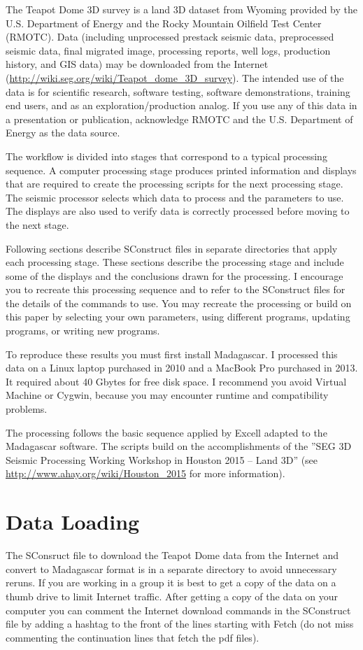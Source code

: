The Teapot Dome 3D survey is a land 3D dataset from Wyoming provided by the U.S. Department of Energy and the Rocky Mountain Oilfield Test Center (RMOTC).  Data (including unprocessed prestack seismic data, preprocessed seismic data, final migrated image, processing reports, well logs, production history, and GIS data) may be downloaded from the Internet (\url{http://wiki.seg.org/wiki/Teapot_dome_3D_survey}).  The intended use of the data is for scientific research, software testing, software demonstrations, training end users, and as an exploration/production analog.  If you use any of this data in a presentation or publication, acknowledge RMOTC and the U.S. Department of Energy as the data source.

The workflow is divided into stages that correspond to a typical processing sequence.  A computer processing stage produces printed information and displays that are required to create the processing scripts for the next processing stage.  The seismic processor selects which data to process and the parameters to use.  The displays are also used to verify data is correctly processed before moving to the next stage.

Following sections describe SConstruct files in separate directories that apply each processing stage.  These sections describe the processing stage and include some of the displays and the conclusions drawn for the processing.  I encourage you to recreate this processing sequence and to refer to the SConstruct files for the details of the commands to use.  You may recreate the processing or build on this paper by selecting your own parameters, using different programs, updating programs, or writing new programs.  

To reproduce these results you must first install Madagascar.  I processed this data on a Linux laptop purchased in 2010 and a MacBook Pro purchased in 2013.  It required about 40 Gbytes for free disk space.  I recommend you avoid Virtual Machine or Cygwin, because you may encounter runtime and compatibility problems.  

The processing follows the basic sequence applied by Excell adapted to the Madagascar software.  The scripts build on the accomplishments of the ''SEG 3D Seismic Processing Working Workshop in Houston 2015 – Land 3D'' (see \url{http://www.ahay.org/wiki/Houston_2015} for more information).

\section{Data Loading}
The SConsruct file to download the Teapot Dome data from the Internet and convert to Madagascar format is in a separate directory to avoid unnecessary reruns.  If you are working in a group it is best to get a copy of the data on a thumb drive to limit Internet traffic.  After getting a copy of the data on your computer you can comment the Internet download commands in the SConstruct file by adding a hashtag to the front of the lines starting with Fetch (do not miss commenting the continuation lines that fetch the pdf files).

